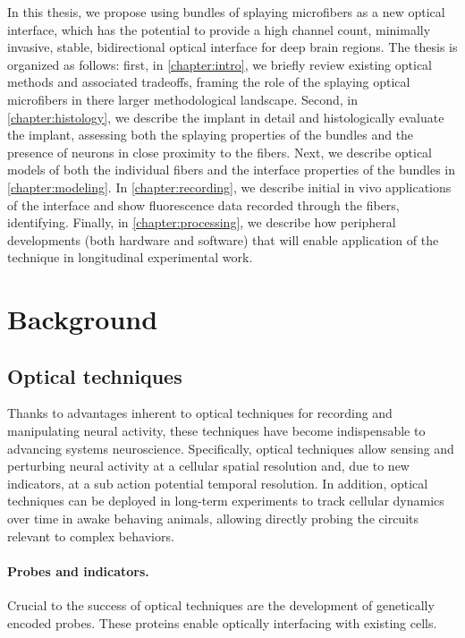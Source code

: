 In this thesis, we propose using bundles of splaying 
microfibers as a new optical interface, which has the 
potential to provide a high channel count, minimally 
invasive, stable, bidirectional optical interface for 
deep brain regions. The thesis is organized as follows: 
first, in \cref{chapter:intro}, we briefly review 
existing optical methods and associated tradeoffs, 
framing the role of the splaying optical microfibers in
there larger methodological landscape. Second, in 
\cref{chapter:histology}, we describe the implant in 
detail and histologically evaluate the implant, 
assessing both the splaying properties of the bundles
and the presence of neurons in close proximity to
the fibers. Next, we describe optical models of both 
the individual fibers and the interface properties of 
the bundles in \cref{chapter:modeling}. In 
\cref{chapter:recording}, we describe initial in vivo
applications of the interface and show fluorescence 
data recorded through the fibers, identifying. Finally, 
in \cref{chapter:processing}, we describe how peripheral 
developments (both hardware and software) that will enable 
application of the technique in longitudinal experimental 
work.

\section{Background}

\subsection{Optical techniques}

Thanks to advantages inherent to optical techniques for 
recording and manipulating neural activity, these techniques 
have become indispensable to advancing systems neuroscience. 
Specifically, optical techniques allow sensing and perturbing 
neural activity at a cellular spatial resolution and, due
to new indicators, at a sub action potential temporal 
resolution. In addition, optical techniques can be deployed 
in long-term experiments to track cellular dynamics over time 
in awake behaving animals, allowing directly probing the 
circuits relevant to complex behaviors.

\paragraph{Probes and indicators.} Crucial to the success of 
optical techniques are the development of genetically encoded 
probes. These proteins enable optically interfacing with 
existing cells. 

